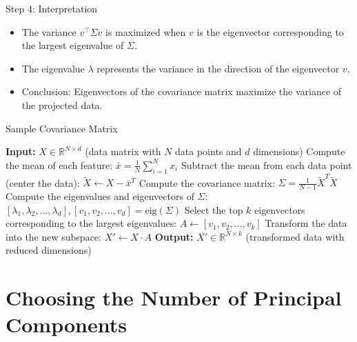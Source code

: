 \documentclass[serif, aspectratio=169]{beamer}
\begin{document}
\begin{frame}{Step 4: Interpretation}
    \begin{itemize}
        \item The variance \( v^\top \Sigma v \) is maximized when \( v \) is the eigenvector corresponding to the largest eigenvalue of \( \Sigma \).
        \item The eigenvalue \( \lambda \) represents the variance in the direction of the eigenvector \( v \).
        \item Conclusion: Eigenvectors of the covariance matrix maximize the variance of the projected data.
    \end{itemize}
\end{frame}

\begin{frame}{Sample Covariance Matrix}
    \begin{algorithm}[H]
    \caption{Sample Covariance Matrix}\label{alg:Sample Covariance Matrix}
    \begin{algorithmic}[1]
        \State \textbf{Input:} $X \in \mathbb{R}^{N \times d}$ (data matrix with $N$ data points and $d$ dimensions)
        \State Compute the mean of each feature:  $\bar{x} = \frac{1}{N} \sum_{i=1}^{N} x_i$
        \State Subtract the mean from each data point (center the data): $\tilde{X} \leftarrow X - \bar{x}^{T}$
        \State Compute the covariance matrix: $\Sigma = \frac{1}{N - 1} \tilde{X}^{T} \tilde{X}$
        \State Compute the eigenvalues and eigenvectors of $\Sigma$: $[\lambda_1, \lambda_2, \dots, \lambda_d], [v_1, v_2, \dots, v_d] = \text{eig}(\Sigma)$
        \State Select the top $k$ eigenvectors corresponding to the largest eigenvalues: $A \leftarrow [v_1, v_2, \dots, v_k]$
        \State Transform the data into the new subspace: $X' \leftarrow X \cdot A$
        \State \textbf{Output:} $X' \in \mathbb{R}^{N \times k}$ (transformed data with reduced dimensions)
    \end{algorithmic}
    \end{algorithm}
\end{frame}

\section{Choosing the Number of Principal Components}
\end{document}
